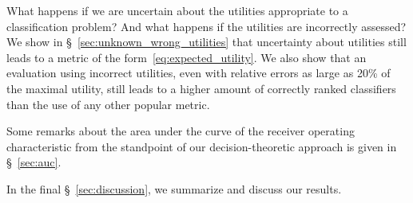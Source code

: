 \documentclass[\ifafour a4paper,12pt,\else a5paper,10pt,\fi%
onecolumn,oneside,article,%
british%
]{memoir}
\theoremstyle{remark}
\theoremstyle{innote}
\newcommand*{\wrench}{{\fontencoding{U}\fontfamily{fontawesomethree}\selectfont\symbol{114}}}
\newcommand{\mynotew}[1]{{\footnotesize\color{notecolour}\wrench\ #1}}
\renewcommand*{\|}[1][]{\nonscript\:#1\vert\nonscript\:\mathopen{}}
\newcommand*{\sect}{\S}%
\begin{document}
What happens if we are uncertain about the utilities appropriate to a classification problem? And what happens if the utilities are incorrectly assessed? We show in \sect~\ref{sec:unknown_wrong_utilities} that uncertainty about utilities still leads to a metric of the form~\eqref{eq:expected_utility}. We also show that an evaluation using incorrect utilities, even with relative errors as large as 20\% of the maximal utility, still leads to a higher amount of correctly ranked classifiers than the use of any other popular metric.

Some remarks about the area under the curve of the receiver operating characteristic from the standpoint of our decision-theoretic approach is given in \sect~\ref{sec:auc}.

In the final \sect~\ref{sec:discussion}, we summarize and discuss our results.



\end{document}
